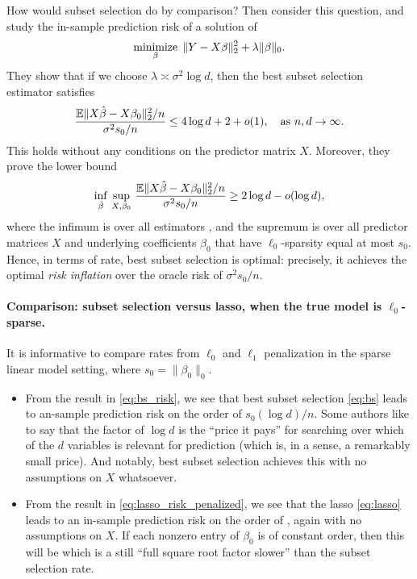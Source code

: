 \documentclass{article}
\begin{document}
How would subset selection do by comparison? Then \citet{foster1994risk}
consider this question, and study the in-sample prediction risk of a solution
\smash{$\hbeta$} of  
\begin{equation}
\label{eq:bs}
\operatorname*{minimize}_\beta \; \|Y - X\beta\|_2^2 + \lambda \|\beta\|_0.
\end{equation}
They show that if we choose $\lambda \asymp \sigma^2\log d$, then the best
subset selection estimator satisfies 
\begin{equation}
\label{eq:bs_risk}
\frac{\mathbb{E}\|X\hat{\beta} - X\beta_0\|_2^2/n}{\sigma^2 s_0/n}  
\leq 4\log d + 2 + o(1), \quad \text{as $n,d \to \infty$}.
\end{equation}
This holds without any conditions on the predictor matrix $X$.  Moreover, they
prove the lower bound  
\[
\inf_{\hat{\beta}} \, \sup_{X,\beta_0} \,
\frac{\mathbb{E}\|X\hat{\beta}-X\beta_0\|_2^2/n}{\sigma^2 s_0/n} 
\geq 2 \log d - o(\log d),  
\]
where the infimum is over all estimators \smash{$\hbeta$}, and the supremum is  
over all predictor matrices $X$ and underlying coefficients $\beta_0$ that have
$\ell_0$-sparsity equal at most $s_0$. Hence, in terms of rate, best subset
selection is optimal: precisely, it achieves the optimal \emph{risk inflation}
over the oracle risk of $\sigma^2 s_0/n$. 

\paragraph{Comparison: subset selection versus lasso, when the true model is 
  $\ell_0$-sparse.}     

It is informative to compare rates from $\ell_0$ and $\ell_1$ penalization in
the sparse linear model setting, where $s_0 = \|\beta_0\|_0$. 

\begin{itemize}
\item From the result in \eqref{eq:bs_risk}, we see that best subset selection
  \eqref{eq:bs} leads to an-sample prediction risk on the order of $s_0 (\log
  d)/n$. Some authors like to say that the factor of $\log d$ is the ``price it
  pays'' for searching over which of the $d$ variables is relevant for
  prediction (which is, in a sense, a remarkably small price). And notably, best 
  subset selection achieves this with no assumptions on $X$ whatsoever.     

\item From the result in \eqref{eq:lasso_risk_penalized}, we see that the lasso 
  \eqref{eq:lasso} leads to an in-sample prediction risk on the order of
  , again with no assumptions on
  $X$. If each nonzero entry of $\beta_0$ is of constant order, then this will
  be  which is a still ``full square root factor
  slower'' than the subset selection rate.   
\end{itemize}
\end{document}
